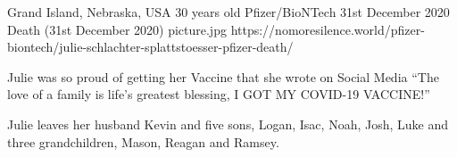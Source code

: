 {Grand Island, Nebraska, USA}
{30 years old}
{Pfizer/BioNTech}
{31st December 2020}
{Death (31st December 2020)}
{picture.jpg}
{https://nomoresilence.world/pfizer-biontech/julie-schlachter-splattstoesser-pfizer-death/}
{

Julie was so proud of getting her Vaccine that she wrote on Social Media “The
love of a family is life’s greatest blessing, I GOT MY COVID-19 VACCINE!”

Julie leaves her husband Kevin and five sons, Logan, Isac, Noah, Josh, Luke and
three grandchildren, Mason, Reagan and Ramsey.

}
